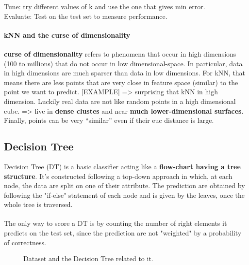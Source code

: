 Tune: try different values of k and use the one that gives min error. \\
Evaluate: Test on the test set to measure performance. \\\\
\textbf{kNN and the curse of dimensionality} 
\\\\
\textbf{curse of dimensionality} refers to phenomena that occur in high dimensions (100 to millions) that do not occur in low dimensional-space. In particular, data in high dimensions are much sparser than data in low dimensions. For kNN, that means there are less points that are very close in feature space (similar) to the point we want to predict. [EXAMPLE] => surprising that kNN in high dimension. Luckily real data are not like random points in a high dimensional cube. => live in \textbf{dense clustes} and near \textbf{much lower-dimensional surfaces}. Finally, points can be very ``similar'' even if their euc distance is large.


\subsection{Decision Tree}

Decision Tree (DT) is a basic classifier acting like a \textbf{flow-chart having a tree structure}. It's constructed following a top-down approach in which, at each node, the data are split on one of their attribute. The prediction are obtained by following the "if-else" statement of each node and is given by the leaves, once the whole tree is traversed.
\\\\
The only way to score a DT is by counting the number of right elements it predicts on the test set, since the prediction are not "weighted" by a probability of correctness.

\begin{figure}[H] %
\centerline{
}
\caption{\label{DT} 
Dataset and the Decision Tree related to it.
}
\end{figure}

